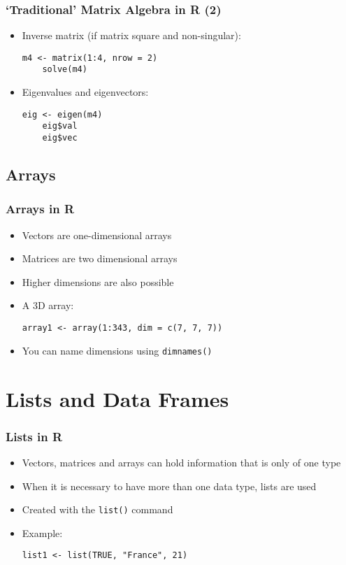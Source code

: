 \documentclass[10pt]{beamer}
\theoremstyle{definition}
\begin{document}
\begin{frame}[fragile]
\frametitle{`Traditional' Matrix Algebra in R (2)}
\begin{itemize}
	\item Inverse matrix (if matrix square and non-singular):
	\begin{lstlisting}[style = rstyle, breaklines]
	m4 <- matrix(1:4, nrow = 2)
	solve(m4)
	\end{lstlisting}

	\item Eigenvalues and eigenvectors:
	\begin{lstlisting}[style = rstyle, breaklines]
	eig <- eigen(m4)
	eig$val
	eig$vec
	\end{lstlisting}
\end{itemize}
\end{frame}

\subsection{Arrays}

\begin{frame}[fragile]
\frametitle{Arrays in R}
\begin{itemize}
	\item Vectors are one-dimensional arrays
	
	\item Matrices are two dimensional arrays
	
	\item Higher dimensions are also possible
	\item A 3D array:
	\begin{lstlisting}[style = rstyle, breaklines]
	array1 <- array(1:343, dim = c(7, 7, 7))
	\end{lstlisting}
	
	\item You can name dimensions using \texttt{dimnames()}
\end{itemize}
\end{frame}


\section{Lists and Data Frames}

\begin{frame}[fragile]
\frametitle{Lists in R}

\begin{itemize}
	\item Vectors, matrices and arrays can hold information that is only of one type

	\item When it is necessary to have more than one data type, lists are used

	\item Created with the \texttt{list()} command
	
	\item Example:
	\begin{lstlisting}[style = rstyle, breaklines]
	list1 <- list(TRUE, "France", 21)
	\end{lstlisting}
\end{itemize}
\end{frame}
\end{document}

